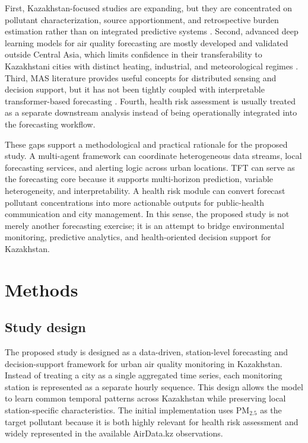 \documentclass[pdflatex,sn-mathphys-num]{sn-jnl}
\begin{document}
First, Kazakhstan-focused studies are expanding, but they are concentrated on pollutant characterization, source apportionment, and retrospective burden estimation rather than on integrated predictive systems \cite{mukhtarov2023winter,ormanova2025astana,tursun2025sources,muratuly2025health}. Second, advanced deep learning models for air quality forecasting are mostly developed and validated outside Central Asia, which limits confidence in their transferability to Kazakhstani cities with distinct heating, industrial, and meteorological regimes \cite{cui2023sparse,wang2023msaformer,hu2024feddeep}. Third, MAS literature provides useful concepts for distributed sensing and decision support, but it has not been tightly coupled with interpretable transformer-based forecasting \cite{dragomir2013mas,zhu2021multisensing}. Fourth, health risk assessment is usually treated as a separate downstream analysis instead of being operationally integrated into the forecasting workflow.

These gaps support a methodological and practical rationale for the proposed study. A multi-agent framework can coordinate heterogeneous data streams, local forecasting services, and alerting logic across urban locations. TFT can serve as the forecasting core because it supports multi-horizon prediction, variable heterogeneity, and interpretability. A health risk module can convert forecast pollutant concentrations into more actionable outputs for public-health communication and city management. In this sense, the proposed study is not merely another forecasting exercise; it is an attempt to bridge environmental monitoring, predictive analytics, and health-oriented decision support for Kazakhstan.

\section{Methods}\label{sec:methods}

\subsection{Study design}\label{subsec:study_design}

The proposed study is designed as a data-driven, station-level forecasting and decision-support framework for urban air quality monitoring in Kazakhstan. Instead of treating a city as a single aggregated time series, each monitoring station is represented as a separate hourly sequence. This design allows the model to learn common temporal patterns across Kazakhstan while preserving local station-specific characteristics. The initial implementation uses PM$_{2.5}$ as the target pollutant because it is both highly relevant for health risk assessment and widely represented in the available AirData.kz observations.
\end{document}
